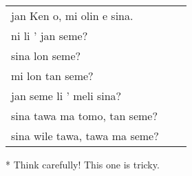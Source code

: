 \begin{supertabular}{p{5,5cm}|ll}
    jan Ken o, mi olin e sina.     &  & \\  %
    ni li ' jan seme?              &  & \\  %
    sina lon seme?                 &  & \\  %
    mi lon tan seme?               &  & \\  %
    jan seme li ' meli sina?       &  & \\    %
    sina tawa ma tomo, tan seme?   &  & \\   %
    sina wile tawa, tawa  ma seme? &  & \\  %
\end{supertabular}

* Think carefully! This one is tricky.
